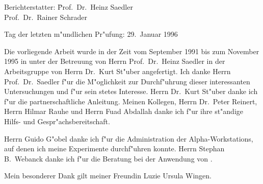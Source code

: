 \documentclass[12pt, a4paper, fleqn]{book}
\begin{document}
{
\pagestyle{empty}
\thispagestyle{empty}

\cleardoublepage

\vspace*{17cm}

\begin{tabbing}
Berichterstatter: \= Prof.\ Dr.\ Heinz Saedler \\
                  \> Prof.\ Dr.\ Rainer Schrader \\
\end{tabbing}

\vspace*{2cm}

\noindent Tag der letzten m"undlichen Pr"ufung: 29.\ Januar 1996

\pagebreak

\thispagestyle{empty}

\vspace*{5cm}

\vfill

Die vorliegende Arbeit wurde in der Zeit vom September 1991 bis zum November 1995 in
unter der Betreuung von Herrn Prof.\ Dr.\ Heinz Saedler in der Arbeitsgruppe von Herrn Dr.\ Kurt St"uber
angefertigt. Ich danke Herrn Prof.\ Dr.\ Saedler f"ur die M"oglichkeit zur Durchf"uhrung dieser interessanten
Untersuchungen und f"ur sein stetes Interesse. Herrn Dr.\ Kurt St"uber danke ich f"ur die partnerschaftliche
Anleitung. Meinen Kollegen, Herrn Dr.\ Peter Reinert, Herrn Hilmar Rauhe und Herrn Fuad Abdallah danke
ich f"ur ihre st"andige Hilfs- und Gespr"achsbereitschaft.

Herrn Guido G"obel danke ich f"ur die Administration der Alpha-Workstations, auf denen ich meine Experimente
durchf"uhren konnte. Herrn Stephan B.\ Webanck danke ich f"ur die Beratung bei der Anwendung von \LaTeXe{}.

Mein besonderer Dank gilt meiner Freundin Luzie Ursula Wingen.

% 
% 

\cleardoublepage
}


\tableofcontents
\cleardoublepage
{}













\end{document}
